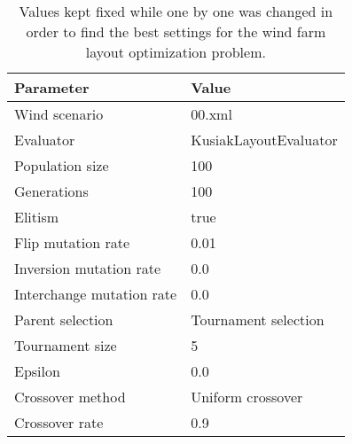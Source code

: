 \documentclass[12pt]{report}
\begin{document}
\begin{table}
\centering
\caption{Values kept fixed while one by one was changed in order to find the best settings for the wind farm layout optimization problem.}
\label{table:fixed settings}
\begin{tabular}{l|l}
\textbf{Parameter} & \textbf{Value} \\ 
\hline 
Wind scenario & 00.xml \\ 
Evaluator & KusiakLayoutEvaluator \\ 
Population size & 100 \\  
Generations & 100 \\ 
Elitism & true \\  
Flip mutation rate & 0.01 \\ 
Inversion mutation rate & 0.0 \\ 
Interchange mutation rate & 0.0 \\ 
Parent selection & Tournament selection \\ 
Tournament size & 5 \\ 
Epsilon & 0.0 \\  
Crossover method & Uniform crossover \\ 
Crossover rate & 0.9 \\ 
\end{tabular} 
\end{table}
\end{document}
